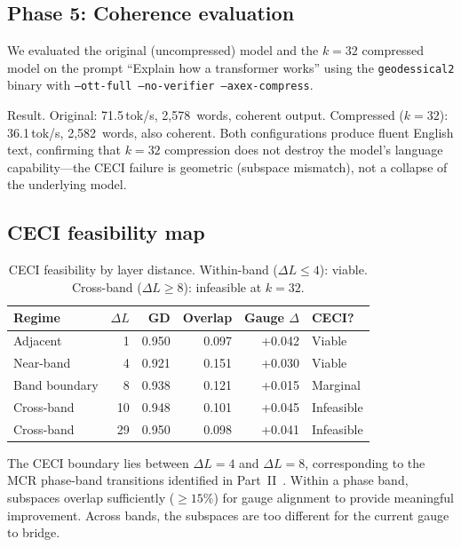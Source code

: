 \documentclass[11pt]{article}
\begin{document}
\subsection{Phase 5: Coherence evaluation}

We evaluated the original (uncompressed) model and the $k{=}32$
compressed model on the prompt ``Explain how a transformer works''
using the \texttt{geodessical2} binary with
\texttt{--ott-full --no-verifier --axex-compress}.

Result.  Original: 71.5\,tok/s, 2,578~words, coherent output.
Compressed ($k{=}32$): 36.1\,tok/s, 2,582~words, also coherent.  Both
configurations produce fluent English text, confirming that $k{=}32$
compression does not destroy the model's language capability---the
CECI failure is geometric (subspace mismatch), not a collapse of the
underlying model.

\subsection{CECI feasibility map}

\begin{table}[h]\centering\small
\caption{CECI feasibility by layer distance.  Within-band
($\Delta L{\le}4$): viable.  Cross-band ($\Delta L{\ge}8$):
infeasible at $k{=}32$.}
\label{tab:ceci-feasibility}
\begin{tabular}{@{}lrrrrl@{}}
\toprule
Regime & $\Delta L$ & GD & Overlap & Gauge $\Delta$ & CECI? \\
\midrule
Adjacent       & 1    & 0.950 & 0.097 & +0.042 & Viable \\
Near-band      & 4    & 0.921 & 0.151 & +0.030 & Viable \\
Band boundary  & 8    & 0.938 & 0.121 & +0.015 & Marginal \\
Cross-band     & 10   & 0.948 & 0.101 & +0.045 & Infeasible \\
Cross-band     & 29   & 0.950 & 0.098 & +0.041 & Infeasible \\
\bottomrule
\end{tabular}
\end{table}

The CECI boundary lies between $\Delta L{=}4$ and $\Delta L{=}8$,
corresponding to the MCR phase-band transitions identified in
Part~II~\cite{stewart2026gp}.  Within a phase band, subspaces overlap
sufficiently (${\ge}15\%$) for gauge alignment to provide meaningful
improvement.  Across bands, the subspaces are too different for the
current gauge to bridge.
\end{document}
